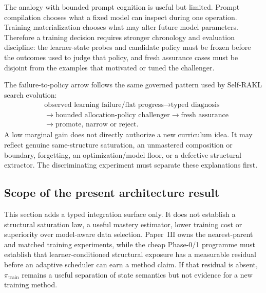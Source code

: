 The analogy with bounded prompt cognition is useful but limited.  Prompt compilation chooses what a fixed model can inspect during one operation.  Training materialization chooses what may alter future model parameters.  Therefore a training decision requires stronger chronology and evaluation discipline: the learner-state probes and candidate policy must be frozen before the outcomes used to judge that policy, and fresh assurance cases must be disjoint from the examples that motivated or tuned the challenger.

The failure-to-policy arrow follows the same governed pattern used by Self-RAKL search evolution:
\[
\begin{aligned}
&\text{observed learning failure/flat progress}
\rightarrow \text{typed diagnosis} \\
&\rightarrow \text{bounded allocation-policy challenger}
\rightarrow \text{fresh assurance} \\
&\rightarrow \text{promote, narrow or reject}.
\end{aligned}
\]
A low marginal gain does not directly authorize a new curriculum idea.  It may reflect genuine same-structure saturation, an unmastered composition or boundary, forgetting, an optimization/model floor, or a defective structural extractor.  The discriminating experiment must separate these explanations first.

\subsection{Scope of the present architecture result}

This section adds a typed integration surface only.  It does not establish a structural saturation law, a useful mastery estimator, lower training cost or superiority over model-aware data selection.  Paper~III owns the nearest-parent and matched training experiments, while the cheap Phase-0/1 programme must establish that learner-conditioned structural exposure has a measurable residual before an adaptive scheduler can earn a method claim.  If that residual is absent, $\pi_{\mathrm{train}}$ remains a useful separation of state semantics but not evidence for a new training method.
